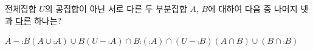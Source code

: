 전체집합 $U$의 공집합이 아닌 서로 다른 두 부분집합 $A$, $B$에 대하여 다음 중 나머지 넷과 \underline{다른} 하나는?
\begin{choices32}{$A-\comp{B}$}{$(A\cup\comp{A})\cup B$}{$(U-\comp{A})\cap B$}{$\comp{(\comp{A})}\cap(U-\comp{B})$}{$(A\cap B)\cup(B\cap\comp{B})$}\end{choices32}
